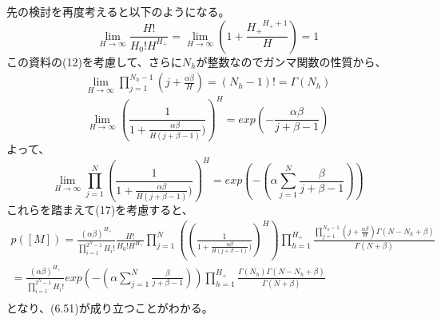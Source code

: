 ﻿\documentclass{jsarticle}
\begin{document}
先の検討を再度考えると以下のようになる。
\begin{equation}
\lim_{H \rightarrow \infty} \frac{H!}{H_0!H^{H_+}} = \lim_{H \rightarrow \infty}(1 + \frac{{H_+}^{H_+ + 1}}{H}) = 1
\end{equation}
この資料の(12)を考慮して、さらに$N_h$が整数なのでガンマ関数の性質から、
\begin{equation}
\begin{split}
\lim_{H \rightarrow \infty}　\prod_{j = 1}^{N_h - 1}(j + \frac{\alpha\beta}{H}) = (N_h - 1)! = \Gamma(N_h)
\end{split}
\end{equation}
\begin{equation}
\lim_{H \rightarrow \infty} (\frac{1}{1 + \frac{\alpha\beta}{H(j + \beta - 1)}) })^{H} = exp(-\frac{\alpha\beta}{j + \beta - 1})
\end{equation}
よって、
\begin{equation}
\lim_{H \rightarrow \infty} \prod_{j = 1}^{N}(\frac{1}{1 + \frac{\alpha\beta}{H(j + \beta - 1)}) })^{H} = exp(-(\alpha \sum_{j = 1}^{N}\frac{\beta}{j + \beta - 1}))
\end{equation}
これらを踏まえて(17)を考慮すると、
\begin{equation}
\begin{split}
p([M]) = \frac{(\alpha\beta)^{H_+}}{\prod_{i=1}^{2^N - 1}H_i!} \frac{H!}{H_0! H^{H_+}} \prod_{j = 1}^{N} ((\frac{1}{1 + \frac{\alpha\beta}{H(j + \beta - 1)}) })^{H})  \prod_{h=1}^{H_+}  \frac{\prod_{j = 1}^{N_h - 1}(j + \frac{\alpha\beta}{H})\Gamma(N - N_h + \beta)}{\Gamma(N + \beta) }\\
= \frac{(\alpha\beta)^{H_+}}{\prod_{i=1}^{2^N - 1}H_i!} exp(-(\alpha \sum_{j = 1}^{N}\frac{\beta}{j + \beta - 1}))　\prod_{h=1}^{H_+}  \frac{\Gamma(N_h)\Gamma(N - N_h + \beta)}{\Gamma(N + \beta) }\\
\end{split}
\end{equation}
となり、(6.51)が成り立つことがわかる。
\end{document}
